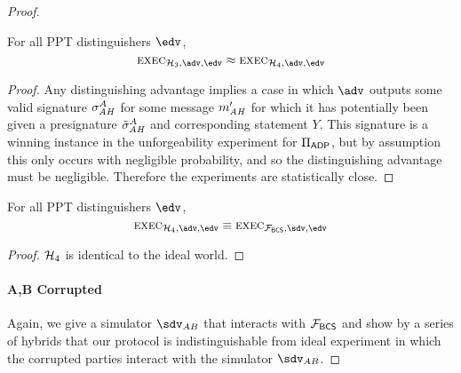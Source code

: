 \begin{proof}
\begin{claim}
For all PPT distinguishers $\env$,
\[
    \exec_{\hybrid_3,\adv,\env} \approx \exec_{\hybrid_4,\adv,\env}
\]
\end{claim}
\begin{proof}
    {Any distinguishing advantage implies a case in which $\adv$ outputs some valid signature $\sigma_{\mathit{AH}}^A$ for some message $m_{\mathit{AH}}'$ for which it has potentially been given a presignature $\tilde\sigma_{\mathit{AH}}^A$ and corresponding statement $Y$. This signature is a winning instance in the unforgeability experiment for $\Pi_{\mathsf{ADP}}$, but by assumption this only occurs with negligible probability, and so the distinguishing advantage must be negligible. Therefore the experiments are statistically close.}
\end{proof}

\begin{claim}
For all PPT distinguishers $\env$,
\[
    \exec_{\hybrid_4,\adv,\env} \equiv \exec_{\flocks,\Sim,\env}
\]
\end{claim}
\begin{proof}
    $\mathcal{H}_4$ is identical to the ideal world.
\end{proof}

\paragraph{A,B Corrupted} Again, we give a simulator $\Sim_{AB}$ that interacts with $\mathcal{F}_{\mathsf{BCS}}$ and show by a series of hybrids that our protocol is indistinguishable from ideal experiment in which the corrupted parties interact with the simulator $\Sim_{AB}$.


\end{proof}
